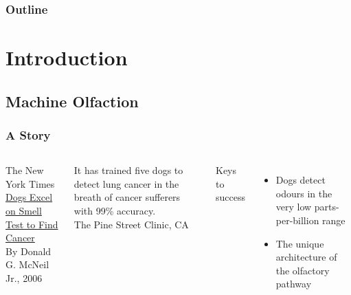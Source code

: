 \documentclass{beamer}
\begin{document}
\begin{frame}
  \frametitle{Outline}
  \tableofcontents
\end{frame}

\section{Introduction}

\subsection{Machine Olfaction}

\begin{frame}
\frametitle{A Story}
\begin{columns}
The New York Times \\
\href{http://www.nytimes.com/2006/01/17/health/17dog.html}{Dogs Excel on Smell Test to Find Cancer} \\
{\scriptsize By Donald G. McNeil Jr., 2006}

\begin{block}{}
It has trained five dogs to detect lung cancer in the breath of cancer sufferers with 99\% accuracy. \\
{\scriptsize The Pine Street Clinic, CA}
\end{block}

Keys to success
\begin{itemize}
  \item Dogs detect odours in the very low parts-per-billion range
  \item The unique architecture of the olfactory pathway
\end{itemize}  


\end{columns}
\end{frame}
\end{document}
